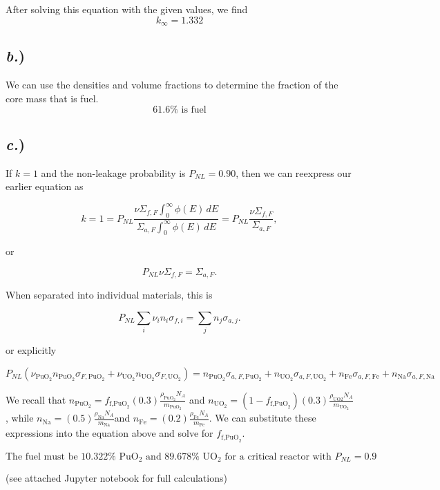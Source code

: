 \documentclass{article}
\begin{document}
After solving this equation with the given values, we find
$$\boxed{ k_{\infty} = 1.332 }$$


\subsection*{\textit{b.})}

We can use the densities and volume fractions to determine the fraction of the core mass that is fuel. 
$$\boxed{ 61.6\% \text{ is fuel} }$$


\subsection*{\textit{c.})}

If $k = 1$ and the non-leakage probability is $P_{NL} = 0.90$, then we can reexpress our earlier equation as

$$ k = 1 = P_{NL}\frac{\nu \Sigma_{f,F} \int_0^{\infty} \phi(E)\,dE}{\Sigma_{a,F} \int_0^{\infty} \phi(E)\,dE} = P_{NL}\frac{\nu \Sigma_{f,F}}{\Sigma_{a,F}},$$

or 

$$ P_{NL}\nu \Sigma_{f,F} = \Sigma_{a,F}. $$

When separated into individual materials, this is 

$$ P_{NL}\sum_i \nu_i n_i \sigma_{f,i} = \sum_j n_j \sigma_{a,j} .$$

or explicitly

$$ P_{NL} \left( \nu_{\text{PuO}_2} n_{\text{PuO}_2} \sigma_{F,\text{PuO}_2} + \nu_{\text{UO}_2} n_{\text{UO}_2} \sigma_{F,\text{UO}_2}\right) = n_{\text{PuO}_2} \sigma_{a,F,\text{PuO}_2} + n_{\text{UO}_2} \sigma_{a,F,\text{UO}_2} + n_{\text{Fe}} \sigma_{a,F,\text{Fe}} + n_{\text{Na}} \sigma_{a,F,\text{Na}} $$

We recall that $n_{\text{PuO}_2} = f_{\text{f,PuO}_2}(0.3)\frac{\rho_{\text{PuO}_2} N_A}{m_{\text{PuO}_2}}$ and $n_{\text{UO}_2} = (1-f_{\text{f,PuO}_2})(0.3)\frac{\rho_{\text{UO}2} N_A}{m_{\text{UO}_2}}$, while $n_{\text{Na}} = (0.5)\frac{\rho_{\text{Na}} N_A}{m_{\text{Na}}}$and $n_{\text{Fe}} = (0.2)\frac{\rho_{\text{Fe}} N_A}{m_{\text{Fe}}}$. We can substitute these expressions into the equation above and solve for $f_{\text{f,PuO}_2}$. 

$$\boxed{ \text{The fuel must be } 10.322\% \text{ PuO}_2 \text{ and } 89.678\% \text{ UO}_2 \text{ for a critical reactor with } P_{NL} = 0.9 }$$

(see attached Jupyter notebook for full calculations)
\end{document}
